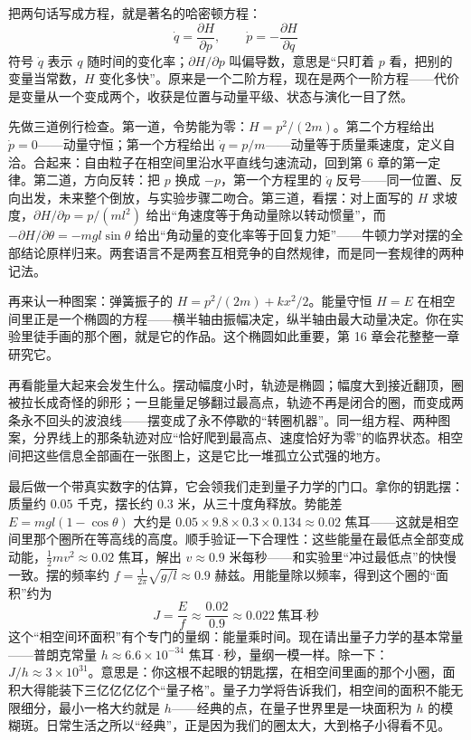 \begin{mathbridge}
把两句话写成方程，就是著名的哈密顿方程：
\[
  \dot{q} = \frac{\partial H}{\partial p}, \qquad
  \dot{p} = -\frac{\partial H}{\partial q}
\]
符号 \(\dot{q}\) 表示 \(q\) 随时间的变化率；\(\partial H/\partial p\) 叫偏导数，意思是“只盯着 \(p\) 看，把别的变量当常数，\(H\) 变化多快”。原来是一个二阶方程，现在是两个一阶方程——代价是变量从一个变成两个，收获是位置与动量平级、状态与演化一目了然。

先做三道例行检查。第一道，令势能为零：\(H = p^{2}/(2m)\)。第二个方程给出 \(\dot{p}=0\)——动量守恒；第一个方程给出 \(\dot{q}=p/m\)——动量等于质量乘速度，定义自洽。合起来：自由粒子在相空间里沿水平直线匀速流动，回到第 6 章的第一定律。第二道，方向反转：把 \(p\) 换成 \(-p\)，第一个方程里的 \(\dot{q}\) 反号——同一位置、反向出发，未来整个倒放，与实验步骤二吻合。第三道，看摆：对上面写的 \(H\) 求坡度，\(\partial H/\partial p = p/(ml^{2})\) 给出“角速度等于角动量除以转动惯量”，而 \(-\partial H/\partial\theta = -mgl\sin\theta\) 给出“角动量的变化率等于回复力矩”——牛顿力学对摆的全部结论原样归来。两套语言不是两套互相竞争的自然规律，而是同一套规律的两种记法。

再来认一种图案：弹簧振子的 \(H=p^{2}/(2m)+kx^{2}/2\)。能量守恒 \(H=E\) 在相空间里正是一个椭圆的方程——横半轴由振幅决定，纵半轴由最大动量决定。你在实验里徒手画的那个圈，就是它的作品。这个椭圆如此重要，第 16 章会花整整一章研究它。

再看能量大起来会发生什么。摆动幅度小时，轨迹是椭圆；幅度大到接近翻顶，圈被拉长成奇怪的卵形；一旦能量足够翻过最高点，轨迹不再是闭合的圈，而变成两条永不回头的波浪线——摆变成了永不停歇的“转圈机器”。同一组方程、两种图案，分界线上的那条轨迹对应“恰好爬到最高点、速度恰好为零”的临界状态。相空间把这些信息全部画在一张图上，这是它比一堆孤立公式强的地方。
\end{mathbridge}

\begin{mainline}
最后做一个带真实数字的估算，它会领我们走到量子力学的门口。拿你的钥匙摆：质量约 \(0.05\) 千克，摆长约 \(0.3\) 米，从三十度角释放。势能差 \(E = mgl(1-\cos\theta)\) 大约是 \(0.05\times9.8\times0.3\times0.134\approx0.02\) 焦耳——这就是相空间里那个圈所在等高线的高度。顺手验证一下合理性：这些能量在最低点全部变成动能，\(\frac{1}{2}mv^{2}\approx0.02\) 焦耳，解出 \(v\approx0.9\) 米每秒——和实验里“冲过最低点”的快慢一致。摆的频率约 \(f=\frac{1}{2\pi}\sqrt{g/l}\approx0.9\) 赫兹。用能量除以频率，得到这个圈的“面积”约为
\[
  J = \frac{E}{f} \approx \frac{0.02}{0.9} \approx 0.022 \ \text{焦耳·秒}
\]
这个“相空间环面积”有个专门的量纲：能量乘时间。现在请出量子力学的基本常量——普朗克常量 \(h\approx6.6\times10^{-34}\) 焦耳·秒，量纲一模一样。除一下：\(J/h\approx3\times10^{31}\)。意思是：你这根不起眼的钥匙摆，在相空间里画的那个小圈，面积大得能装下三亿亿亿亿个“量子格”。量子力学将告诉我们，相空间的面积不能无限细分，最小一格大约就是 \(h\)——经典的点，在量子世界里是一块面积为 \(h\) 的模糊斑。日常生活之所以“经典”，正是因为我们的圈太大，大到格子小得看不见。
\end{mainline}

